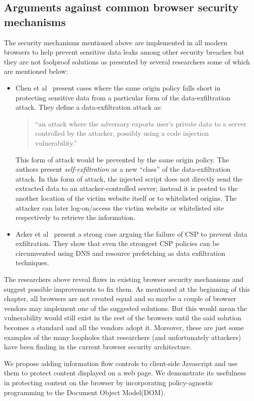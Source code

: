 \subsection{Arguments against common browser security mechanisms \label{sec:against}}
The security mechanisms mentioned above are implemented in all modern browsers to
help prevent sensitive data leaks among other security breaches but they are not
foolproof solutions as presented by several researchers some of which are mentioned
below:
\begin{itemize}
  \item Chen et al~\cite{SelfExfil} present cases where the same origin policy falls short
  in protecting sensitive data from a particular form of the data-exfiltration attack.
  They define a data-exfiltration attack as:

  \begin{quotation}
    ``an attack where the adversary exports user's private data to a server controlled
    by the attacker, possibly using a code injection vulnerability.''
  \end{quotation}
  This form of attack would be prevented by the same origin policy. The authors present
  \textit{self-exfiltration} as a new ``class'' of the data-exfiltration attack. In
  this form of attack, the injected script does not directly send the extracted data
  to an attacker-controlled server; instead it is posted to the another location
  of the victim website itself or to whitelisted origins. The attacker can later
  log-on/access the victim website or whitelisted site respectively to retrieve the
  information.

  \item Acker et al~\cite{DataExfilCSP} present a strong case arguing the failure of
  CSP to prevent data exfiltration. They show that even the strongest CSP policies
  can be circumvented using DNS and resource prefetching as data exfiltration
  techniques.
\end{itemize}
The researchers above reveal flaws in existing browser security mechanisms and suggest
possible improvements to fix them. As mentioned at the beginning of this chapter,
all browsers are not created equal and so maybe a couple of browser vendors may
implement one of the suggested solutions. But this would mean the vulnerability
would still exist in the rest of the browsers until the said solution becomes a
standard and all the vendors adopt it. Moreover, these are just some examples of
the many loopholes that researchers (and unfortunately attackers) have been finding
in the current browser security architecture.

We propose adding information flow controls to client-side Javascript and use them
to protect content displayed on a web page. We demonstrate its usefulness in
protecting content on the browser by incorporating policy-agnostic programming to
the Document Object Model(DOM).

